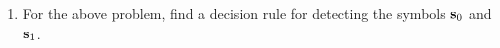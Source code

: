 \begin{enumerate}
%
\item
For the above problem, find a decision rule for detecting the symbols $\mathbf{s}_0 $ and $\mathbf{s}_1$.\\
%

\end{enumerate}
